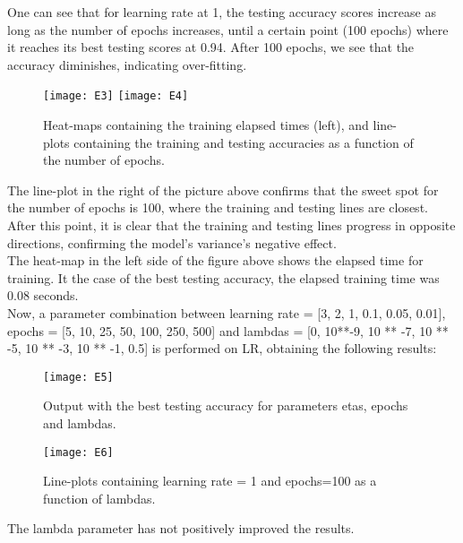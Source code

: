 One can see that for learning rate at 1, the testing accuracy scores increase as long as the number of epochs increases, until a certain point (100 epochs) where it reaches its best testing scores at 0.94. After 100 epochs, we see that the accuracy diminishes, indicating over-fitting.

\begin{figure}[H]
\label{fig:E2}
\centering
\texttt{[image: E3]}
\texttt{[image: E4]}
\caption{Heat-maps containing the training elapsed times (left), and line-plots containing the training and testing accuracies as a function of the number of epochs.}
\end{figure}

The line-plot in the right of the picture above confirms that the sweet spot for the number of epochs is 100, where the training and testing lines are closest. After this point, it is clear that the training and testing lines progress in opposite directions, confirming the model's variance's negative effect.\\

The heat-map in the left side of the figure above shows the elapsed time for training. It the case of the best testing accuracy, the elapsed training time was 0.08 seconds.\\

Now, a parameter combination between learning rate = [3, 2, 1, 0.1, 0.05, 0.01], epochs = [5, 10, 25, 50, 100, 250, 500] and lambdas = [0, 10**-9, 10 ** -7, 10 ** -5, 10 ** -3, 10 ** -1, 0.5] is performed on LR, obtaining the following results:

\begin{figure}[H]
\label{fig:E3}
\centering
\texttt{[image: E5]}
\caption{Output with the best testing accuracy for parameters etas, epochs and lambdas.}
\end{figure}

\begin{figure}[H]
\label{fig:E4}
\centering
\texttt{[image: E6]}
\caption{Line-plots containing learning rate = 1 and epochs=100 as a function of lambdas.}
\end{figure}

The lambda parameter has not positively improved the results.
